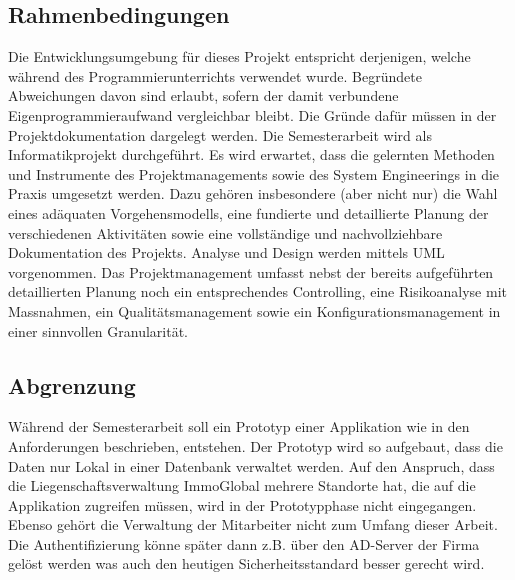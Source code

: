 \subsection{Rahmenbedingungen}
Die Entwicklungsumgebung für dieses Projekt entspricht derjenigen, welche während des Programmierunterrichts verwendet wurde. Begründete Abweichungen davon sind erlaubt, sofern der damit verbundene Eigenprogrammieraufwand vergleichbar bleibt. Die Gründe dafür müssen in der Projektdokumentation dargelegt werden.
Die Semesterarbeit wird als Informatikprojekt durchgeführt. Es wird erwartet, dass die gelernten Methoden und Instrumente des Projektmanagements sowie des System Engineerings in die Praxis umgesetzt werden. Dazu gehören insbesondere (aber nicht nur) die Wahl eines adäquaten Vorgehensmodells, eine fundierte und detaillierte Planung der verschiedenen Aktivitäten sowie eine vollständige und nachvollziehbare Dokumentation des Projekts. Analyse und Design werden mittels UML vorgenommen.
Das Projektmanagement umfasst nebst der bereits aufgeführten detaillierten Planung noch ein entsprechendes Controlling, eine Risikoanalyse mit Massnahmen, ein Qualitätsmanagement sowie ein Konfigurationsmanagement in einer sinnvollen Granularität.

\subsection{Abgrenzung}
Während der Semesterarbeit soll ein Prototyp einer Applikation wie in den Anforderungen beschrieben, entstehen. Der Prototyp wird so aufgebaut, dass die Daten nur Lokal in einer Datenbank verwaltet werden. Auf den Anspruch, dass die Liegenschaftsverwaltung ImmoGlobal mehrere Standorte hat, die auf die Applikation zugreifen müssen, wird in der Prototypphase nicht eingegangen.\\
Ebenso gehört die Verwaltung der Mitarbeiter nicht zum Umfang dieser Arbeit. Die Authentifizierung könne später dann z.B. über den AD-Server der Firma gelöst werden was auch den heutigen Sicherheitsstandard besser gerecht wird.

